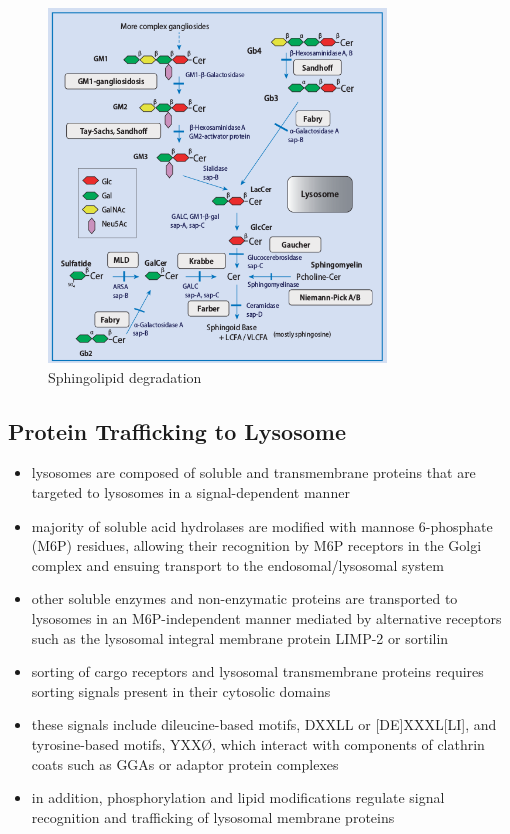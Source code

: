 \documentclass{scrartcl}
\begin{document}
\begin{figure}[htbp]
\centering
\includegraphics[width=0.8\textwidth]{./figures/sl_degradation.png}
\caption{\label{fig:org16ffe21}
Sphingolipid degradation}
\end{figure}

\subsection{Protein Trafficking to Lysosome}
\label{sec:org6dc0e2d}
\begin{itemize}
\item lysosomes are composed of soluble and transmembrane proteins that
are targeted to lysosomes in a signal-dependent manner
\item majority of soluble acid hydrolases are modified with mannose
6-phosphate (M6P) residues, allowing their recognition by M6P
receptors in the Golgi complex and ensuing transport to the
endosomal/lysosomal system
\item other soluble enzymes and non-enzymatic proteins are transported to
lysosomes in an M6P-independent manner mediated by alternative
receptors such as the lysosomal integral membrane protein LIMP-2 or
sortilin
\item sorting of cargo receptors and lysosomal transmembrane proteins
requires sorting signals present in their cytosolic domains
\item these signals include dileucine-based motifs, DXXLL or [DE]XXXL[LI],
and tyrosine-based motifs, YXXØ, which interact with components of
clathrin coats such as GGAs or adaptor protein complexes
\item in addition, phosphorylation and lipid modifications regulate signal
recognition and trafficking of lysosomal membrane proteins
\end{itemize}
\end{document}
